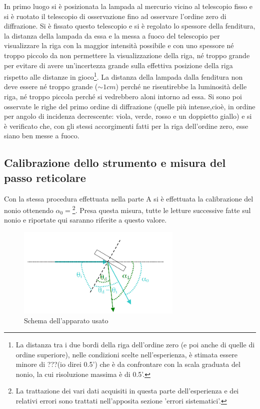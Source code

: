 \documentclass[a4paper,10pt]{article}
\begin{document}
{{{{{{In primo luogo si è posizionata la lampada al mercurio vicino al telescopio fisso e si è ruotato il telescopio di osservazione fino ad osservare l'ordine zero di diffrazione. Si è fissato questo telescopio e si è regolato lo spessore della fenditura, la distanza della lampada da essa e la messa a fuoco del telescopio per visualizzare la riga con la maggior intensità possibile e con uno spessore né troppo piccolo da non permettere la visualizzazione della riga, né troppo grande per evitare di avere un'incertezza grande sulla effettiva posizione della riga rispetto alle distanze in gioco\footnote{La distanza tra i due bordi della riga dell'ordine zero (e poi anche di quelle di ordine superiore), nelle condizioni scelte nell'esperienza, è stimata essere minore di ???(io direi 0.5') che è da confrontare con la scala graduata del nonio, la cui risoluzione massima è di 0.5'.}.
La distanza della lampada dalla fenditura non deve essere né troppo grande ($\sim 1 cm$) perché ne risentirebbe la luminosità delle riga, né troppo piccola perché si vedrebbero aloni intorno ad essa.
Si sono poi osservate le righe del primo ordine di diffrazione (quelle più intense,cioè, in ordine per angolo di incidenza decrescente: viola, verde, rosso e un doppietto giallo) e si è verificato che, con gli stessi accorgimenti fatti per la riga dell'ordine zero, esse siano ben messe a fuoco.

\subsection{Calibrazione dello strumento e misura del passo reticolare}
Con la stessa procedura effettuata nella parte A si è effettuata la calibrazione del nonio ottenendo $\alpha_0 = $\footnote{La trattazione dei vari dati acquisiti in questa parte dell'esperienza e dei relativi errori sono trattati nell'apposita sezione 'errori sistematici'.}. Presa questa misura, tutte le letture successive fatte sul nonio e riportate qui saranno riferite a questo valore.

\begin{figure}[H]
	\centering
	\includegraphics[width=0.7\textwidth]{../grafici/Angoli.png}
	\caption{Schema dell'apparato usato}
	\label{fig:angoli}
\end{figure}

}}}}}}
\end{document}
